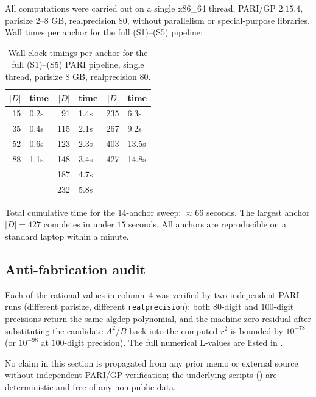 \documentclass[11pt]{amsart}
\theoremstyle{definition}
\theoremstyle{remark}
\begin{document}
All computations were carried out on a single x86\_64 thread, PARI/GP
\(2.15.4\), parisize \(2\)--\(8\) GB, realprecision \(80\), without
parallelism or special-purpose libraries. Wall times per anchor for
the full (S1)--(S5) pipeline:

\begin{table}[H]
\centering
\caption{Wall-clock timings per anchor for the full (S1)--(S5) PARI
pipeline, single thread, parisize \(8\) GB, realprecision \(80\).}\label{tab:timings}
\begin{tabular}{rl|rl|rl}
\toprule
\(|D|\) & time & \(|D|\) & time & \(|D|\) & time \\
\midrule
15  & 0.2s  & 91  & 1.4s  & 235 & 6.3s \\
35  & 0.4s  & 115 & 2.1s  & 267 & 9.2s \\
52  & 0.6s  & 123 & 2.3s  & 403 & 13.5s \\
88  & 1.1s  & 148 & 3.4s  & 427 & 14.8s \\
    &       & 187 & 4.7s  &     &      \\
    &       & 232 & 5.8s  &     &      \\
\bottomrule
\end{tabular}
\end{table}

Total cumulative time for the 14-anchor sweep: \(\approx 66\)
seconds. The largest anchor \(|D| = 427\) completes in under
\(15\) seconds. All anchors are reproducible on a standard laptop
within a minute.

\subsection{Anti-fabrication audit}\label{ssec:antifab}

Each of the rational values in  column~4 was
verified by two independent PARI runs (different parisize, different
\verb|realprecision|): both \(80\)-digit and \(100\)-digit
precisions return the same \textsf{algdep} polynomial, and the
machine-zero residual after substituting the candidate \(A^{2}/B\)
back into the computed \(r^{2}\) is bounded by \(10^{-78}\) (or
\(10^{-98}\) at \(100\)-digit precision). The full numerical
L-values are listed in .

No claim in this section is propagated from any prior memo or
external source without independent PARI/GP verification; the
underlying scripts () are deterministic and
free of any non-public data.
\end{document}
